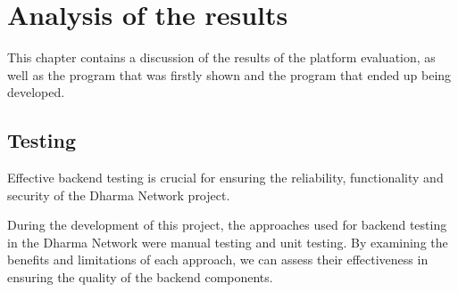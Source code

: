 \chapter{Analysis of the results}\label{chap:chap5}

This chapter contains a discussion of the results of the platform evaluation, as well as the program that was firstly shown and the program that ended up being developed.\newline

\section{Testing}

Effective backend testing is crucial for ensuring the reliability, functionality and security of the Dharma Network project.\newline

During the development of this project, the approaches used for backend testing in the Dharma Network were manual testing and unit testing. By examining the benefits and limitations of each approach, we can assess their effectiveness in ensuring the quality of the backend components.\newline

